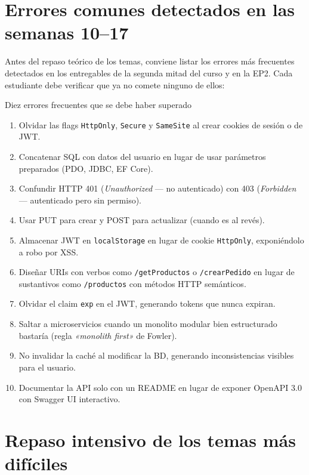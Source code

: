 \section{Errores comunes detectados en las semanas 10--17}

Antes del repaso teórico de los temas, conviene listar los errores
más frecuentes detectados en los entregables de la segunda mitad del
curso y en la EP2. Cada estudiante debe verificar que ya no comete
ninguno de ellos:

\begin{cajaadvertencia}{Diez errores frecuentes que se debe haber superado}
\begin{enumerate}
\item Olvidar las flags \texttt{HttpOnly}, \texttt{Secure} y
\texttt{SameSite} al crear cookies de sesión o de JWT.
\item Concatenar SQL con datos del usuario en lugar de usar parámetros
preparados (PDO, JDBC, EF Core).
\item Confundir HTTP 401 (\emph{Unauthorized} --- no autenticado) con
403 (\emph{Forbidden} --- autenticado pero sin permiso).
\item Usar PUT para crear y POST para actualizar (cuando es al revés).
\item Almacenar JWT en \texttt{localStorage} en lugar de cookie
\texttt{HttpOnly}, exponiéndolo a robo por XSS.
\item Diseñar URIs con verbos como \texttt{/getProductos} o
\texttt{/crearPedido} en lugar de sustantivos como \texttt{/productos}
con métodos HTTP semánticos.
\item Olvidar el claim \texttt{exp} en el JWT, generando tokens que
nunca expiran.
\item Saltar a microservicios cuando un monolito modular bien
estructurado bastaría (regla \emph{«monolith first»} de Fowler).
\item No invalidar la caché al modificar la BD, generando
inconsistencias visibles para el usuario.
\item Documentar la API solo con un README en lugar de exponer
OpenAPI 3.0 con Swagger UI interactivo.
\end{enumerate}
\end{cajaadvertencia}

\section{Repaso intensivo de los temas más difíciles}

